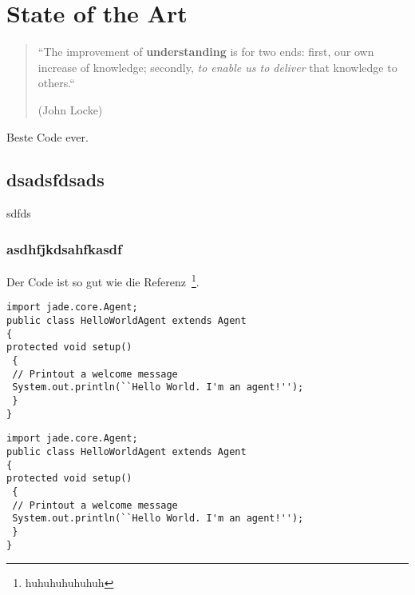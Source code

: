 
\chapter{State of the Art} \label{chapter:stateoftheart}

\begin{quotation}
``The improvement of \textbf{understanding} is for two ends: first, our own increase of knowledge; secondly, \textit{to enable us to deliver} that knowledge to others.``
\begin{flushright}
(John Locke)
\end{flushright}
\end{quotation}


Beste Code ever.


\section{dsadsfdsads}
sdfds

\subsection{asdhfjkdsahfkasdf}


Der Code ist so gut wie die Referenz~\cite{bellifemine_book_2007}\footnote{huhuhuhuhuhuh}. 

\begin{lstlisting} 
import jade.core.Agent;
public class HelloWorldAgent extends Agent 
{
protected void setup() 
 {
 // Printout a welcome message
 System.out.println(``Hello World. I'm an agent!'');
 }
}
\end{lstlisting}


\begin{lstlisting} 
import jade.core.Agent;
public class HelloWorldAgent extends Agent 
{
protected void setup() 
 {
 // Printout a welcome message
 System.out.println(``Hello World. I'm an agent!'');
 }
}
\end{lstlisting}